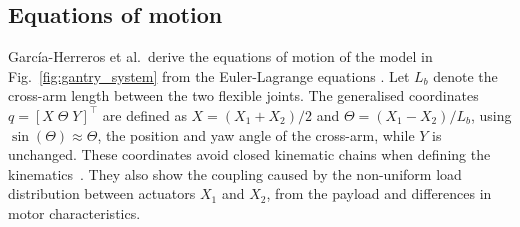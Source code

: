\subsection{Equations of motion}\label{sec:baseline}
%
Garc\'ia-Herreros et al.\ derive the equations of motion of the model
in Fig.~\ref{fig:gantry_system} from the Euler-Lagrange equations
\cite[Eqs.~(3) to~(8)]{garcia2013model}.
Let $L_b$ denote the cross-arm length between the two flexible joints.
The generalised coordinates $q=[X\;\Theta\;Y]^\top$ are defined as 
$X=(X_1+X_2)/2$ and 
$\Theta=(X_1-X_2)/L_b$, using $\sin(\Theta)\approx\Theta$, the position and yaw angle of
the cross-arm, while $Y$ is unchanged.
These coordinates avoid closed kinematic chains when defining the
kinematics~\cite{garcia2013model}.
They also show the coupling caused by the non-uniform load distribution
between actuators $X_1$ and $X_2$, from the payload and differences in
motor characteristics.
